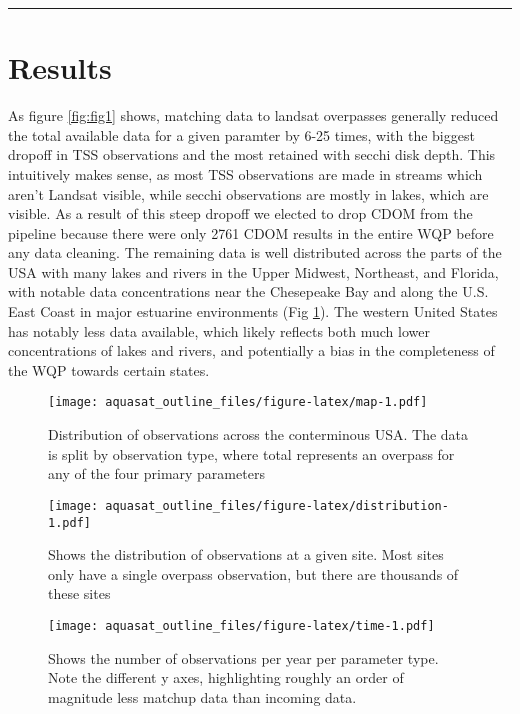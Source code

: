 \documentclass[]{article}
\begin{document}
\begin{center}\rule{0.5\linewidth}{\linethickness}\end{center}

\hypertarget{results}{%
\section{Results}\label{results}}

As figure \ref{fig:fig1} shows, matching data to landsat overpasses
generally reduced the total available data for a given paramter by 6-25
times, with the biggest dropoff in TSS observations and the most
retained with secchi disk depth. This intuitively makes sense, as most
TSS observations are made in streams which aren't Landsat visible, while
secchi observations are mostly in lakes, which are visible. As a result
of this steep dropoff we elected to drop CDOM from the pipeline because
there were only 2761 CDOM results in the entire WQP before any data
cleaning. The remaining data is well distributed across the parts of the
USA with many lakes and rivers in the Upper Midwest, Northeast, and
Florida, with notable data concentrations near the Chesepeake Bay and
along the U.S. East Coast in major estuarine environments (Fig
\ref{fig:map}). The western United States has notably less data
available, which likely reflects both much lower concentrations of lakes
and rivers, and potentially a bias in the completeness of the WQP
towards certain states.

\begin{figure}
\centering
\texttt{[image: aquasat\_outline\_files/figure-latex/map-1.pdf]}
\caption{\label{fig:map} Distribution of observations across the
conterminous USA. The data is split by observation type, where total
represents an overpass for any of the four primary parameters}
\end{figure}

\begin{figure}
\centering
\texttt{[image: aquasat\_outline\_files/figure-latex/distribution-1.pdf]}
\caption{\label{fig:distribution} Shows the distribution of observations
at a given site. Most sites only have a single overpass observation, but
there are thousands of these sites}
\end{figure}

\begin{figure}
\centering
\texttt{[image: aquasat\_outline\_files/figure-latex/time-1.pdf]}
\caption{\label{fig:time} Shows the number of observations per year per
parameter type. Note the different y axes, highlighting roughly an order
of magnitude less matchup data than incoming data.}
\end{figure}
\end{document}
